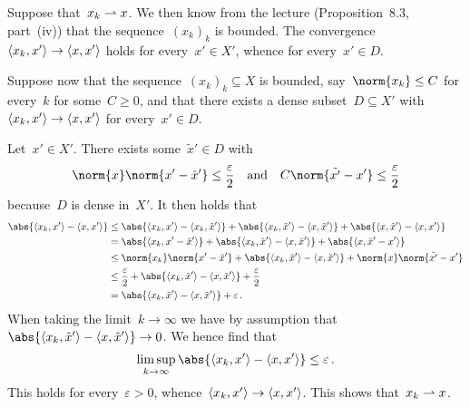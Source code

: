\section{}





\subsection{}

Suppose that~$x_k \rightharpoonup x$.
We then know from the lecture (Proposition~8.3, part~(iv)) that the sequence~$(x_k)_k$ is bounded.
The convergence~$\langle x_k, x'\rangle \to \langle x, x'\rangle$ holds for every~$x' \in X'$, whence for every~$x' \in D$.

Suppose now that the sequence~$(x_k)_k \subseteq X$ is bounded, say~$\norm{x_k} \leq C$ for every~$k$ for some~$C \geq 0$, and that there exists a dense subset~$D \subseteq X'$ with~$\langle x_k, x'\rangle \to \langle x, x'\rangle$ for every~$x' \in D$.

Let~$x' \in X'$.
There exists some~$\tilde{x}' \in D$ with
\[
  \norm{x} \norm{x' - \tilde{x}'} \leq \frac{\varepsilon}{2}
  \quad\text{and}\quad
  C \norm{\tilde{x'} - x'} \leq \frac{\varepsilon}{2}
\]
because~$D$ is dense in~$X'$.
It then holds that
\begin{align*}
  \abs{ \bil{x_k, x'} - \bil{x, x'} }
  &\leq
    \abs{ \bil{x_k, x'} - \bil{x_k, \tilde{x}'} }
  + \abs{ \bil{x_k, \tilde{x}'} - \bil{x, \tilde{x}'} }
  + \abs{ \bil{x, \tilde{x}'} - \bil{x, x'} } \\
  &=
      \abs{ \bil{x_k, x' - \tilde{x}' } }
    + \abs{ \bil{x_k, \tilde{x}'} - \bil{x, \tilde{x}' } }
    + \abs{ \bil{x, \tilde{x}' - x' } } \\
  &\leq
      \norm{x_k} \norm{x' - \tilde{x}'}
    + \abs{ \bil{x_k, \tilde{x}'} - \bil{x, \tilde{x}' } }
    + \norm{x} \norm{\tilde{x'} - x'} \\
  &\leq
      \frac{\varepsilon}{2}
    + \abs{ \bil{x_k, \tilde{x}'} - \bil{x, \tilde{x}' } }
    + \frac{\varepsilon}{2} \\
  &=  \abs{ \bil{x_k, \tilde{x}'} - \bil{x, \tilde{x}' } }
    + \varepsilon \,.
\end{align*}
When taking the limit~$k \to \infty$ we have by assumption that~$\abs{ \bil{x_k, \tilde{x}'} - \bil{x, \tilde{x}' } } \to 0$.
We hence find that
\[
        \limsup_{k \to \infty} \abs{ \bil{x_k, x'} - \bil{x, x'} }
  \leq  \varepsilon \,.
\]
This holds for every~$\varepsilon > 0$, whence~$\langle x_k, x'\rangle \to \langle x,x'\rangle$.
This shows that~$x_k \rightharpoonup x$.





